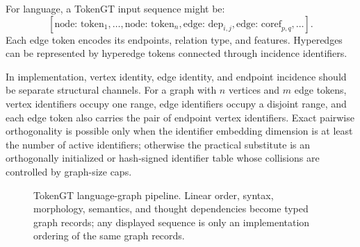 \documentclass[11pt]{article}
\newcommand{\1}{\mathbf{1}}
\begin{document}
For language, a TokenGT input sequence might be:
\[
[\text{node: token}_1,\ldots,\text{node: token}_n,\text{edge: dep}_{i,j},\text{edge: coref}_{p,q},\ldots].
\]
Each edge token encodes its endpoints, relation type, and features. Hyperedges can be represented by hyperedge tokens connected through incidence identifiers.

In implementation, vertex identity, edge identity, and endpoint incidence should be separate structural channels. For a graph with \(n\) vertices and \(m\) edge tokens, vertex identifiers occupy one range, edge identifiers occupy a disjoint range, and each edge token also carries the pair of endpoint vertex identifiers. Exact pairwise orthogonality is possible only when the identifier embedding dimension is at least the number of active identifiers; otherwise the practical substitute is an orthogonally initialized or hash-signed identifier table whose collisions are controlled by graph-size caps.

\begin{figure}[H]
\centering
{}
\caption{TokenGT language-graph pipeline. Linear order, syntax, morphology, semantics, and thought dependencies become typed graph records; any displayed sequence is only an implementation ordering of the same graph records.}
\label{fig:tokengt_language}
\end{figure}
\end{document}
